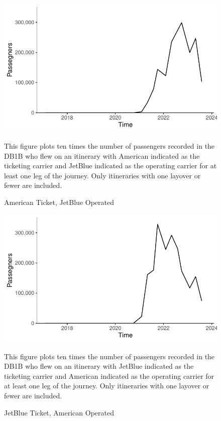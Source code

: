 \documentclass{article}
\begin{document}
\begin{appendices}
	
	\begin{figure}
		\caption{American Ticket, JetBlue Operated}
		\label{fig:NEA_Mix_AAB6}
		\includegraphics[width = \linewidth]{NEA_AATk_B6Op.pdf}
		\begin{minipage}{\textwidth} %
			{\footnotesize This figure plots ten times the number of passengers recorded in the DB1B who flew on an itinerary with American indicated as the ticketing carrier and JetBlue indicated as the operating carrier for at least one leg of the journey. Only itineraries with one layover or fewer are included. }
		\end{minipage}
	\end{figure}
	
	\begin{figure}
		\caption{JetBlue Ticket, American Operated}
		\label{fig:NEA_Mix_B6AA}
		\includegraphics[width = \linewidth]{NEA_B6TK_AAOp.pdf}
		\begin{minipage}{\textwidth} %
			{\footnotesize This figure plots ten times the number of passengers recorded in the DB1B who flew on an itinerary with JetBlue indicated as the ticketing carrier and American indicated as the operating carrier for at least one leg of the journey. Only itineraries with one layover or fewer are included. }
		\end{minipage}
	\end{figure}
	



\end{appendices}
\end{document}
